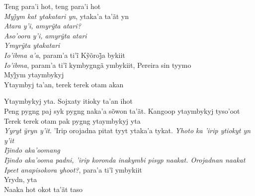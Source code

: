 \noindent   Teng para'i hot, teng para'i hot\\
  \textit{Myj̃ym kat ytakatari yn}, ytaka’a ta’ãt yn\\
  \textit{Atara y’i, amyrỹta atari?}\\
  \textit{Aso’oora y’i, amyrỹta atari}\\
  \textit{Ymyrỹta ytakatari}\\
  \textit{Io’ibma a’a}, param’a ti’ĩ Kỹõroj̃a bykiit\\
  \textit{Io’ibma}, param’a ti’ĩ kymbygngã ymbykiit, Pereira sin tyymo\\
  Myj̃ym ytaymbykyj\\
  Ytaymbyj ta'an, terek terek otam akan

\smallskip
 \begin{center}\end{center}
 \smallskip

\noindent   Ytaymbykyj yta. Sojxaty itioky ta'an ihot\\
  Peng pygng paj syk pygng naka'a sõwon ta'ãt. Kangoop ytaymbykyj tyso'oot\\
  Terek terek otam pak pygng ytaymbykyj yta\\
  \textit{Yyryt ỹryn y’it}. ’Irip orojadna pitat tyyt ytaka’a tykat. \textit{Yhoto ka ’irip ytiokyt yn y’it}\\
  \textit{Ij̃indo aka’oomang}\\
  \textit{Ij̃indo aka’ooma padni, ’irip koronda inakymbi pisyp naakat. Orojadnan naakat}\\
  \textit{Ipeet anapisokora yhoot?}, para’a ti’ĩ ymbykiit\\
  Yrydn, yta\\
  Naaka hot okot ta'ãt taso

